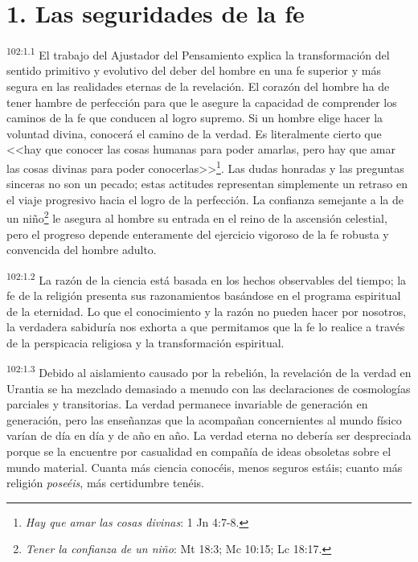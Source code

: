 \section*{1. Las seguridades de la fe}
\par
\textsuperscript{102:1.1} El trabajo del Ajustador del Pensamiento explica la transformación del sentido primitivo y evolutivo del deber del hombre en una fe superior y más segura en las realidades eternas de la revelación. El corazón del hombre ha de tener hambre de perfección para que le asegure la capacidad de comprender los caminos de la fe que conducen al logro supremo. Si un hombre elige hacer la voluntad divina, conocerá el camino de la verdad. Es literalmente cierto que <<hay que conocer las cosas humanas para poder amarlas, pero hay que amar las cosas divinas para poder conocerlas>>\footnote{\textit{Hay que amar las cosas divinas}: 1 Jn 4:7-8.}. Las dudas honradas y las preguntas sinceras no son un pecado; estas actitudes representan simplemente un retraso en el viaje progresivo hacia el logro de la perfección. La confianza semejante a la de un niño\footnote{\textit{Tener la confianza de un niño}: Mt 18:3; Mc 10:15; Lc 18:17.} le asegura al hombre su entrada en el reino de la ascensión celestial, pero el progreso depende enteramente del ejercicio vigoroso de la fe robusta y convencida del hombre adulto.

\par
\textsuperscript{102:1.2} La razón de la ciencia está basada en los hechos observables del tiempo; la fe de la religión presenta sus razonamientos basándose en el programa espiritual de la eternidad. Lo que el conocimiento y la razón no pueden hacer por nosotros, la verdadera sabiduría nos exhorta a que permitamos que la fe lo realice a través de la perspicacia religiosa y la transformación espiritual.

\par
\textsuperscript{102:1.3} Debido al aislamiento causado por la rebelión, la revelación de la verdad en Urantia se ha mezclado demasiado a menudo con las declaraciones de cosmologías parciales y transitorias. La verdad permanece invariable de generación en generación, pero las enseñanzas que la acompañan concernientes al mundo físico varían de día en día y de año en año. La verdad eterna no debería ser despreciada porque se la encuentre por casualidad en compañía de ideas obsoletas sobre el mundo material. Cuanta más ciencia conocéis, menos seguros estáis; cuanto más religión \textit{poseéis}, más certidumbre tenéis.


